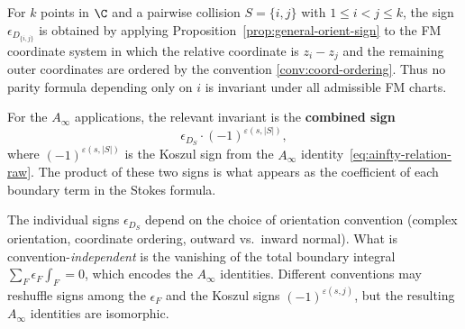 \begin{corollary}
For $k$ points in $\C$ and a pairwise collision
$S=\{i,j\}$ with $1\le i<j\le k$, the sign
$\epsilon_{D_{\{i,j\}}}$ is obtained by applying
Proposition~\ref{prop:general-orient-sign} to the FM coordinate
system in which the relative coordinate is $z_i-z_j$ and the remaining
outer coordinates are ordered by the convention
\ref{conv:coord-ordering}. Thus no parity formula depending only on
$i$ is invariant under all admissible FM charts.

For the $A_\infty$ applications, the relevant invariant is the
\textbf{combined sign}
\[
\epsilon_{D_S}\cdot(-1)^{\varepsilon(s,|S|)},
\]
where $(-1)^{\varepsilon(s,|S|)}$ is the Koszul sign from the $A_\infty$ identity~\eqref{eq:ainfty-relation-raw}. The product of these two signs is what appears as the coefficient of each boundary term in the Stokes formula.
\end{corollary}

\begin{remark}
The individual signs $\epsilon_{D_S}$ depend on the choice of orientation convention (complex orientation, coordinate ordering, outward vs.\ inward normal). What is convention-\emph{independent} is the vanishing of the total boundary integral $\sum_F \epsilon_F\int_F = 0$, which encodes the $A_\infty$ identities. Different conventions may reshuffle signs among the $\epsilon_F$ and the Koszul signs $(-1)^{\varepsilon(s,j)}$, but the resulting $A_\infty$ identities are isomorphic.
\end{remark}
